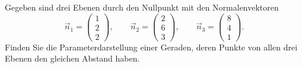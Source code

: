 Gegeben sind drei Ebenen durch den Nullpunkt mit den Normalenvektoren
\[
\vec{n}_1
=
\begin{pmatrix}1\\2\\2\end{pmatrix}
,\qquad
\vec{n}_2
=
\begin{pmatrix}2\\6\\3\end{pmatrix}
,\qquad
\vec{n}_3
=
\begin{pmatrix}8\\4\\1\end{pmatrix}.
\]
Finden Sie die Parameterdarstellung einer Geraden, deren Punkte von allen drei
Ebenen den gleichen Abstand haben.


